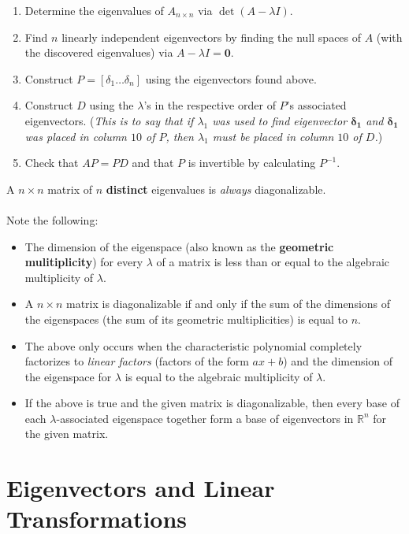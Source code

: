 \documentclass[12pt]{article}
\newcommand{\R}{\mathbb{R}}
\newcommand{\bt}[1]{\textbf{{#1}}}
\newcommand{\bm}[1]{\mathbf{{#1}}}
\begin{document}
\begin{enumerate}
    \item Determine the eigenvalues of $A_{n\times n}$ via $\det(A - \lambda I)$.
    \item Find $n$ linearly independent eigenvectors by finding the null spaces
    of $A$ (with the discovered eigenvalues) via $A - \lambda I = \bm{0}$.
    \item Construct $P = [\delta_1 \dots \delta_n]$ using the eigenvectors found above.
    \item Construct $D$ using the $\lambda$'s in the respective order of $P$'s associated eigenvectors.
    (\emph{This is to say that if $\lambda_1$ was used to find eigenvector $\bm{\delta_1}$ and $\bm{\delta_1}$ was placed in column $10$ of $P$,
    then $\lambda_1$ must be placed in column $10$ of $D$.})
    \item Check that $AP = PD$ and that $P$ is invertible by calculating $P^{-1}$.
\end{enumerate}

A $n \times n$ matrix of $n$ \bt{distinct} eigenvalues is \emph{always} diagonalizable. \\ \\

Note the following:

\begin{itemize}
    \item The dimension of the eigenspace (also known as the \bt{geometric mulitiplicity}) for every $\lambda$ of a matrix
    is less than or equal to the algebraic multiplicity of $\lambda$.
    \item A $n \times n$ matrix is diagonalizable if and only if the sum of the dimensions
    of the eigenspaces (the sum of its geometric multiplicities) is equal to $n$.
    \item The above only occurs when the characteristic polynomial completely factorizes to \emph{linear factors}
    (factors of the form $ax + b$) and the dimension of the eigenspace for
    $\lambda$ is equal to the algebraic multiplicity of $\lambda$.
    \item If the above is true and the given matrix is diagonalizable, then
    every base of each $\lambda$-associated eigenspace together form a base
    of eigenvectors in $\R^n$ for the given matrix.
\end{itemize}

\section*{Eigenvectors and Linear Transformations}
\end{document}
